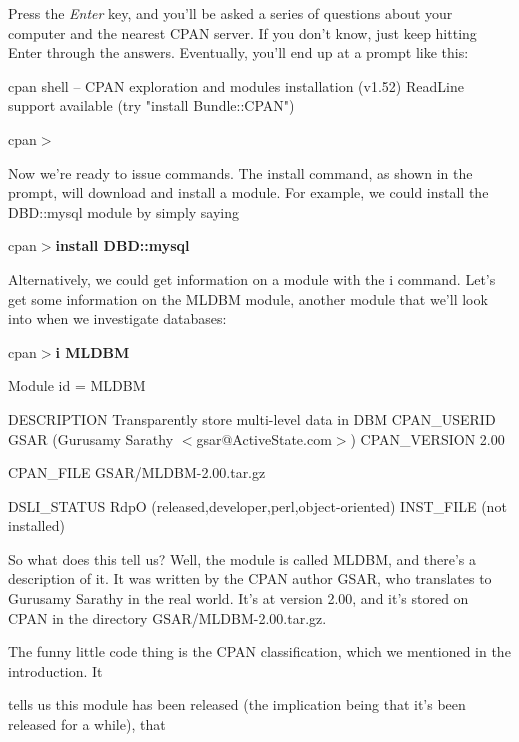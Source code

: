 \documentclass[a4paper,11pt]{book}
\begin{document}
\noindent Press the \textit{Enter }key, and you'll be asked a series of questions about your computer and the nearest CPAN server. If you don't know, just keep hitting Enter through the answers. Eventually, you'll end up at a prompt like this:

\noindent 

\noindent cpan shell -- CPAN exploration and modules installation (v1.52) ReadLine support available (try "install Bundle::CPAN")

\noindent 

\noindent cpan$>$

\noindent 

\noindent Now we're ready to issue commands. The install command, as shown in the prompt, will download and install a module. For example, we could install the DBD::mysql module by simply saying

\noindent 

\noindent cpan$>$\textbf{install DBD::mysql}

\noindent 

\noindent Alternatively, we could get information on a module with the i command. Let's get some information on the MLDBM module, another module that we'll look into when we investigate databases:

\noindent 

\noindent cpan$>$\textbf{i MLDBM}

\noindent Module id = MLDBM

\noindent DESCRIPTION  Transparently store multi-level data in DBM CPAN\_USERID  GSAR (Gurusamy Sarathy $<$gsar@ActiveState.com$>$) CPAN\_VERSION 2.00

\noindent CPAN\_FILE GSAR/MLDBM-2.00.tar.gz

\noindent DSLI\_STATUS  RdpO (released,developer,perl,object-oriented) INST\_FILE (not installed)

\noindent 

\noindent So what does this tell us? Well, the module is called MLDBM, and there's a description of it. It was written by the CPAN author GSAR, who translates to Gurusamy Sarathy in the real world. It's at version 2.00, and it's stored on CPAN in the directory GSAR/MLDBM-2.00.tar.gz.

\noindent 

\noindent The funny little code thing is the CPAN classification, which we mentioned in the introduction. It

\noindent tells us this module has been released (the implication being that it's been released for a while), that
\end{document}
